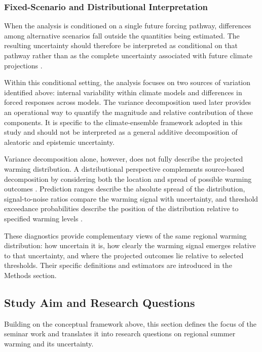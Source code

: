\documentclass[
]{krantz}
\begin{document}
\subsubsection{Fixed-Scenario and Distributional Interpretation}\label{fixed-scenario-and-distributional-interpretation}

When the analysis is conditioned on a single future forcing pathway, differences among alternative scenarios fall outside the quantities being estimated. The resulting uncertainty should therefore be interpreted as conditional on that pathway rather than as the complete uncertainty associated with future climate projections \citep{Hawkins2009}.

Within this conditional setting, the analysis focuses on two sources of variation identified above: internal variability within climate models and differences in forced responses across models. The variance decomposition used later provides an operational way to quantify the magnitude and relative contribution of these components. It is specific to the climate-ensemble framework adopted in this study and should not be interpreted as a general additive decomposition of aleatoric and epistemic uncertainty.

Variance decomposition alone, however, does not fully describe the projected warming distribution. A distributional perspective complements source-based decomposition by considering both the location and spread of possible warming outcomes \citep{Tebaldi2007}. Prediction ranges describe the absolute spread of the distribution, signal-to-noise ratios compare the warming signal with uncertainty, and threshold exceedance probabilities describe the position of the distribution relative to specified warming levels \citep{Hawkins2009}.

These diagnostics provide complementary views of the same regional warming distribution: how uncertain it is, how clearly the warming signal emerges relative to that uncertainty, and where the projected outcomes lie relative to selected thresholds. Their specific definitions and estimators are introduced in the Methods section.

\subsection{Study Aim and Research Questions}\label{study-aim-and-research-questions}

Building on the conceptual framework above, this section defines the focus of the seminar work and translates it into research questions on regional summer warming and its uncertainty.
\end{document}
